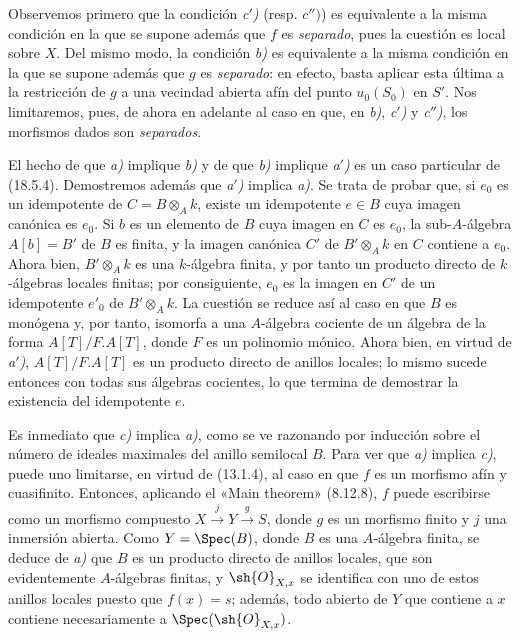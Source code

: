 Observemos primero que la condición \emph{c$'$)} (resp. $c'')$) es equivalente a la misma condición en la que se supone además que $f$ es \emph{separado}, pues la cuestión es local sobre $X$. Del mismo modo, la condición \emph{b)} es equivalente a la misma condición en la que se supone además que $g$ es \emph{separado}: en efecto, basta aplicar esta última a la restricción de $g$ a una vecindad abierta afín del punto $u_0(S_0)$ en $S'$. Nos limitaremos, pues, de ahora en adelante al caso en que, en \emph{b)}, \emph{c$'$)} y \emph{c$''$)}, los morfismos dados son \emph{separados}.

El hecho de que \emph{a)} implique \emph{b)} y de que \emph{b)} implique \emph{a$'$)} es un caso particular de (18.5.4). Demostremos además que \emph{a$'$)} implica \emph{a)}. Se trata de probar que, si $e_0$ es un idempotente de $C=B\otimes_A k$, existe un idempotente $e\in B$ cuya imagen canónica es $e_0$. Si $b$ es un elemento de $B$ cuya imagen en $C$ es $e_0$, la sub-$A$-álgebra $A[b]=B'$ de $B$ es finita, y la imagen canónica $C'$ de $B'\otimes_A k$ en $C$ contiene a $e_0$. Ahora bien, $B'\otimes_A k$ es una $k$-álgebra finita, y por tanto un producto directo de $k$-álgebras locales finitas; por consiguiente, $e_0$ es la imagen en $C'$ de un idempotente $e'_0$ de $B'\otimes_A k$. La cuestión se reduce así al caso en que $B$ es monógena y, por tanto, isomorfa a una $A$-álgebra cociente de un álgebra de la forma $A[T]/F.A[T]$, donde $F$ es un polinomio mónico. Ahora bien, en virtud de \emph{a$'$)}, $A[T]/F.A[T]$ es un producto directo de anillos locales; lo mismo sucede entonces con todas sus álgebras cocientes, lo que termina de demostrar la existencia del idempotente $e$.

Es inmediato que \emph{c)} implica \emph{a)}, como se ve razonando por inducción sobre el número de ideales maximales del anillo semilocal $B$. Para ver que \emph{a)} implica \emph{c)}, puede uno limitarse, en virtud de (13.1.4), al caso en que $f$ es un morfismo afín y cuasifinito. Entonces, aplicando el «Main theorem» (8.12.8), $f$ puede escribirse como un morfismo compuesto
$X\xrightarrow{j}Y\xrightarrow{g}S$,
donde $g$ es un morfismo finito y $j$ una inmersión abierta. Como $Y=\Spec(B)$, donde $B$ es una $A$-álgebra finita, se deduce de \emph{a)} que $B$ es un producto directo de anillos locales, que son evidentemente $A$-álgebras finitas, y $\sh{O}_{X,x}$ se identifica con uno de estos anillos locales puesto que $f(x)=s$; además, todo abierto de $Y$ que contiene a $x$ contiene necesariamente a $\Spec(\sh{O}_{X,x})$.

